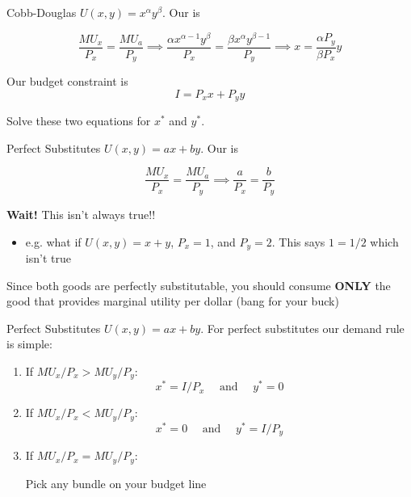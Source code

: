 \documentclass[12pt,t]{beamer}
\begin{document}
\begin{frame}{Cobb-Douglas}
  $U(x,y) = x^\alpha y^\beta$. Our  is 
  
  $$
    \frac{MU_x}{P_x} = \frac{MU_a}{P_y} 
    \implies \frac{\alpha x^{\alpha - 1} y^{\beta}}{P_x} = \frac{\beta x^{\alpha} y^{\beta - 1}}{P_y} 
    \implies x = \frac{\alpha P_y}{\beta P_x} y
  $$

  \bigskip
  Our budget constraint is 
  $$
    I = P_x x + P_y y
  $$

  \bigskip
  Solve these two equations for $x^*$ and $y^*$.
\end{frame}

\begin{frame}{Perfect Substitutes}
  $U(x,y) = ax + by$. Our  is

  $$
    \frac{MU_x}{P_x} = \frac{MU_a}{P_y} \implies \frac{a}{P_x} = \frac{b}{P_y}
  $$

  \pause\bigskip
  \textbf{Wait!} This isn't always true!!
  \begin{itemize}
    \item e.g. what if $U(x,y) = x + y$, $P_x = 1$, and $P_y = 2$. This says $1 = 1/2$ which isn't true
  \end{itemize} 

  \pause\bigskip
  Since both goods are perfectly substitutable, you should consume \textbf{ONLY} the good that provides marginal utility per dollar (bang for your buck)
\end{frame}

\begin{frame}{Perfect Substitutes}
  $U(x,y) = ax + by$. For perfect substitutes our demand rule is simple: 
  
  \bigskip
  \begin{enumerate}
    \item If $MU_x/P_x > MU_y / P_y$: 
    $$
      x^* = I / P_x \quad\text{ and }\quad y^* = 0
    $$

    \item If $MU_x/P_x < MU_y / P_y$: 
    $$
      x^* = 0 \quad\text{ and }\quad y^* = I / P_y
    $$
    
    \item If $MU_x/P_x = MU_y / P_y$: 
    
    \begin{center}
      Pick any bundle on your budget line 
    \end{center}
  \end{enumerate}
\end{frame}
\end{document}

